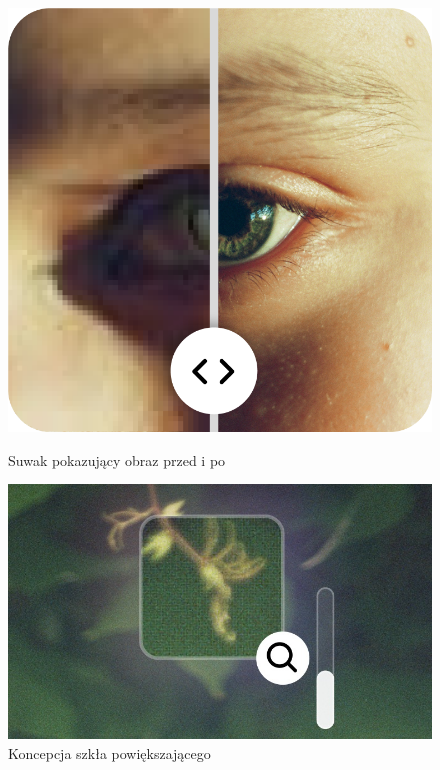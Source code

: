 \begin{figure}[ht]
    \centering
    \begin{minipage}[t]{0.3\linewidth}
        \includegraphics[width=\linewidth]{Rozdziały/06.Aplikacja/Obrazy/slider.png}
        \caption{Suwak pokazujący obraz przed i po}
        \label{fig:image95}
    \end{minipage}
    \hspace{0.5cm}
    \begin{minipage}[t]{0.5\linewidth}
        \includegraphics[width=\linewidth]{Rozdziały/06.Aplikacja/Obrazy/concept-zoom.jpg}
        \caption{Koncepcja szkła powiększającego}
        \label{fig:image96}
    \end{minipage}
\end{figure}


